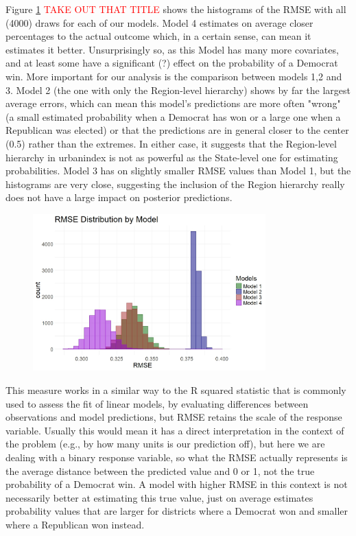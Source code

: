 \documentclass[12pt]{article}
\newcommand{\red}[1]{\textcolor{red}{#1}}
\begin{document}
Figure \ref{fig:rmse} \red{TAKE OUT THAT TITLE} shows the histograms of the RMSE with all (4000) draws for each of our models.
Model 4 estimates on average closer percentages to the actual outcome which, in a certain sense, can mean it estimates it better. Unsurprisingly so, as this Model has many more covariates, and at least some have a significant (?) effect on the probability of a Democrat win.
More important for our analysis is the comparison between models 1,2 and 3.
Model 2 (the one with only the Region-level hierarchy) shows by far the largest average errors, which can mean this model's predictions are more often "wrong" (a small estimated probability when a Democrat has won or a large one when a Republican was elected) or that the predictions are in general closer to the center (0.5) rather than the extremes. In either case, it suggests that the Region-level hierarchy in urbanindex is not as powerful as the State-level one for estimating probabilities.
Model 3 has on slightly smaller RMSE values than Model 1, but the histograms are very close, suggesting the inclusion of the Region hierarchy really does not have a large impact on posterior predictions.

\begin{figure}[h]
	\centering
	\includegraphics[width=0.8\textwidth]{model_comp_figures/RMSE_all.jpeg}
	\caption{}
	\label{fig:rmse}
\end{figure}



This measure works in a similar way to the R squared statistic that is commonly used to assess the fit of linear models, by evaluating differences between observations and model predictions, but RMSE retains the scale of the response variable.
Usually this would mean it has a direct interpretation in the context of the problem (e.g., by how many units is our prediction off), but here we are dealing with a binary response variable, so what the RMSE actually represents is the average distance between the predicted value and 0 or 1, not the true probability of a Democrat win.
A model with higher RMSE in this context is not necessarily better at estimating this true value, just on average estimates probability values that are larger for districts where a Democrat won and smaller where a Republican won instead. 
\end{document}
